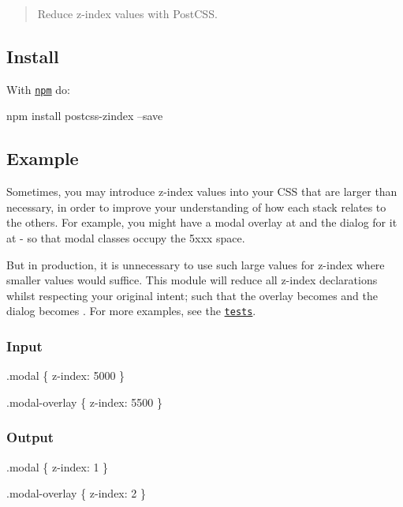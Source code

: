 \begin{quote}
Reduce z-\/index values with Post\+C\+SS. \end{quote}


\subsection*{Install}

With \href{https://npmjs.org/package/postcss-zindex}{\tt npm} do\+:


\begin{DoxyCode}
npm install postcss-zindex --save
\end{DoxyCode}


\subsection*{Example}

Sometimes, you may introduce z-\/index values into your C\+SS that are larger than necessary, in order to improve your understanding of how each stack relates to the others. For example, you might have a modal overlay at {} and the dialog for it at {} -\/ so that modal classes occupy the {\ttfamily 5xxx} space.

But in production, it is unnecessary to use such large values for z-\/index where smaller values would suffice. This module will reduce all z-\/index declarations whilst respecting your original intent; such that the overlay becomes {} and the dialog becomes {}. For more examples, see the \href{test.js}{\tt tests}.

\subsubsection*{Input}


\begin{DoxyCode}
.modal \{
    z-index: 5000
\}

.modal-overlay \{
    z-index: 5500
\}
\end{DoxyCode}


\subsubsection*{Output}


\begin{DoxyCode}
.modal \{
    z-index: 1
\}

.modal-overlay \{
    z-index: 2
\}
\end{DoxyCode}


